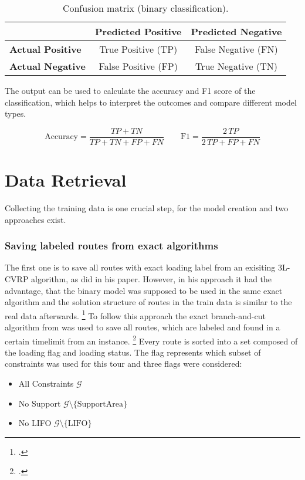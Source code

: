 \begin{table}[ht]
    \centering
    \begin{tabular}{@{}lcc@{}}
        \toprule
                                 & \textbf{Predicted Positive} & \textbf{Predicted Negative} \\
        \midrule
        \textbf{Actual Positive} & True Positive (TP)          & False Negative (FN)         \\
        \textbf{Actual Negative} & False Positive (FP)         & True Negative (TN)          \\
        \bottomrule
    \end{tabular}
    \caption{Confusion matrix (binary classification).}
    \label{tab:confusion_matrix}
\end{table}
The output can be used to calculate the accuracy and F1 score of the classification, which
helps to interpret the outcomes and compare different model types.

\[
    \text{Accuracy}=\frac{TP+TN}{TP+TN+FP+FN}
    \qquad
    \text{F1}=\frac{2\,TP}{2\,TP+FP+FN}
\]


\section{Data Retrieval}
\label{sec:DataRetrieval}
Collecting the training data is one crucial step, for the model creation and two approaches exist.

\subsubsection{Saving labeled routes from exact algorithms}
The first one is to save all routes with exact loading label from an exisiting \gls{3L-CVRP}
algorithm, as \cite{zhang_learning-based_2022} did in his paper. However, in his approach it
had the advantage, that the binary model was supposed to be used in the same exact algorithm
and the solution structure of routes in the train data is similar to the real data afterwards. \footcite[cf.][]{zhang_learning-based_2022}
To follow this approach the exact branch-and-cut algorithm from \cite{tamke_branch-and-cut_2024} was
used to save all routes, which are labeled and found in a certain timelimit from an instance.
\footcites[Retrieved from][]{tamke_repository_2024}[cf.][]{tamke_branch-and-cut_2024} Every route
is sorted into a set composed of the loading flag and loading status. The flag represents which
subset of constraints was used for this tour and three flags were considered:
\begin{itemize}
    \item All Constraints $\mathcal{G}$
    \item No Support $\mathcal{G}\setminus \{\text{SupportArea}\}$
    \item No LIFO $\mathcal{G}\setminus \{\text{LIFO}\}$
\end{itemize}

